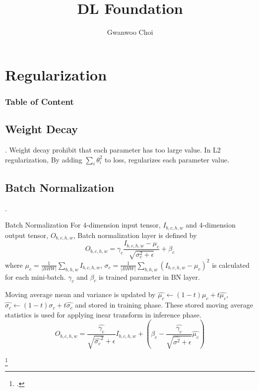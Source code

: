 \documentclass[8pt]{beamer}
\title{DL Foundation}
\author{Gwanwoo Choi}
\newcommand{\abs}[1]{\left\lvert #1 \right\rvert}
\begin{document}
\begin{frame}
    \titlepage
\end{frame}


\section{Regularization}
\begingroup
    \begin{frame}
        \frametitle{Table of Content}
        \tableofcontents
    \end{frame}
\endgroup

\subsection{Weight Decay}
\begin{frame}{.}
    Weight decay prohibit that each parameter has too large value.
    In L2 regularization, By adding $\sum_i \theta_i^2$ to loss, regularizes each parameter value.
\end{frame}

\subsection{Batch Normalization}


\begin{frame}{.}

    \begin{block}{Batch Normalization}
        For $4$-dimension input tensor, $I_{b,c,h,w}$ and $4$-dimension output tensor, $O_{b,c,h,w}$, Batch normalization layer is defined by
        \[
            O_{b,c,h,w} = \gamma_c \frac{I_{b,c,h,w} - \mu_c}{\sqrt{\sigma^2_c + \epsilon}} + \beta_c
        \]
        where $\mu_c = \frac{1}{\abs{BHW} } \sum_{b,h,w} I_{b,c,h,w}$, $\sigma_c = \frac{1}{\abs{BHW}} \sum_{b,h,w} (I_{b,c,h,w} - \mu_c)^2$ is calculated for each mini-batch. $\gamma_c$ and $\beta_c$ is trained parameter in BN layer.

        \smallskip
        Moving average mean and variance is updated by $\hat{\mu_c} \leftarrow (1-t)\mu_c + t\hat{\mu_c}$, $\hat{\sigma_c} \leftarrow (1-t) \sigma_c + t \hat{\sigma_c}$ and stored in training phase. These stored moving average statistics is used for applying inear transform in inference phase.
        \[
            O_{b,c,h,w} = \frac{\hat{\gamma_c}}{\sqrt{\hat{\sigma_c}^2}+ \epsilon} I_{b,c,h,w} + \left(\beta_c  - \frac{\hat{\gamma_c}}{\sqrt{\hat{\sigma^2} + \epsilon}}\hat{\mu_c}\right)
        \]
    \end{block}


    \footcite{Understanding_Batch_Normalization_nips_2018,ioffe2015batch}
\end{frame}
\end{document}
